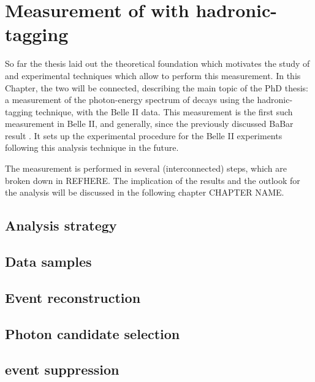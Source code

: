 \chapter{Measurement of \safeBtoXsgamma with hadronic-tagging}

So far the thesis laid out the theoretical foundation which motivates the study of \BtoXsgamma 
and experimental techniques which allow to perform this measurement.
In this Chapter, the two will be connected, describing the main topic of the PhD thesis: 
a measurement of the photon-energy spectrum of \BtoXsgamma decays using the hadronic-tagging technique,
with the Belle II data.
This measurement is the first such measurement in Belle II, and generally, since the previously discussed BaBar result \cite{BaBar:2007yhb}.
It sets up the experimental procedure for the Belle II experiments following this analysis technique in the future.

The measurement is performed in several (interconnected) steps, which are broken down in REFHERE.
The implication of the results and the outlook for the analysis will be discussed in the following chapter CHAPTER NAME.


\section{Analysis strategy}\label{sec:analysis_strategy}


\section{Data samples}\label{sec:data_samples}


\section{Event reconstruction}\label{sec:event_reconstruction}


\section{Photon candidate selection}\label{sec:photon_selection}


\section{\texorpdfstring{\epem\ra\qqbar}{e+e-->qqbar} event suppression}\label{sec:continuum_suppression}
